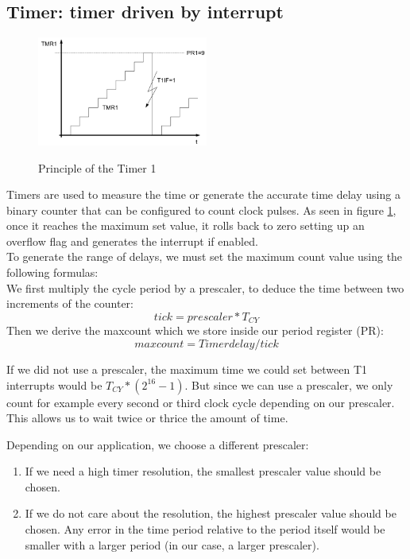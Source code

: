 \subsection{Timer: timer driven by interrupt}

\begin{figure}[H]
    \caption{Principle of the Timer 1 \cite{alex}}
        \centering
            \includegraphics[width=0.5\textwidth]{figures/software/t1_demo.png}
            \label{fig:t1_demo}
\end{figure}

Timers are used to measure the time or generate the accurate time delay using a binary counter that can be configured to count clock pulses. As seen in figure \ref{fig:t1_demo}, once it reaches the maximum set value, it rolls back to zero setting up an overflow flag and generates the interrupt if enabled. \\

\noindent
To generate the range of delays, we must set the maximum count value using the following formulas:\\
We first multiply the cycle period by a prescaler, to deduce the time between two increments of the counter:
$$tick=prescaler*T_{CY}$$
Then we derive the maxcount which we store inside our period register (PR):
$$maxcount=Timer delay/tick$$

If we did not use a prescaler, the maximum time we could set between T1 interrupts would be $T_{CY}*(2^{16}-1)$. But since we can use a prescaler, we only count for example every second or third clock cycle depending on our prescaler. This allows us to wait twice or thrice the amount of time.

Depending on our application, we choose a different prescaler:
\begin{enumerate}
    \item If we need a high timer resolution, the smallest prescaler value should be chosen. 
    \item If we do not care about the resolution, the highest prescaler value should be chosen. Any error in the time period relative to the period itself would be smaller with a larger period (in our case, a larger prescaler).
\end{enumerate}

